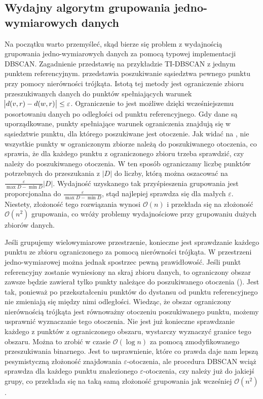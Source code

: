 \subsection{Wydajny algorytm grupowania jedno-wymiarowych danych}
Na początku warto przemyśleć, skąd bierze się problem z wydajnością grupowania jedno-wymiarowych danych za pomocą typowej implementacji DBSCAN. Zagadnienie przedstawię na przykładzie TI-DBSCAN z jednym punktem referencyjnym.  przedstawia poszukiwanie sąsiedztwa pewnego punktu przy pomocy nierówności trójkąta. Istotą tej metody jest ograniczenie zbioru przeszukiwanych danych do punktów spełniających warunek $ \abs{d(v, r) - d(w, r)} \le \varepsilon $. Ograniczenie to jest możliwe dzięki wcześniejszemu posortowaniu danych po odległości od punktu referencyjnego. Gdy dane są uporządkowane, punkty spełniające warunek ograniczenia znajdują się w sąsiedztwie punktu, dla którego poszukiwane jest otoczenie. Jak widać na , nie wszystkie punkty w ograniczonym zbiorze należą do poszukiwanego otoczenia, co sprawia, że dla każdego punktu z ograniczonego zbioru trzeba sprawdzić, czy należy do poszukiwanego otoczenia. W ten sposób ograniczamy liczbę punktów potrzebnych do przeszukania z $ |D| $ do liczby, którą można oszacować na $ \frac{\varepsilon}{\max{D}-\min{D}}|D| $. Wydajność uzyskanego tak przyśpieszenia grupowania jest proporcjonalna do $ \frac{\varepsilon}{\max{D}-\min{D}} $, stąd najlepiej sprawdza się dla małych $ \varepsilon $. Niestety, złożoność tego rozwiązania wynosi $ \mathcal{O}(n) $ i przekłada się na złożoność $ \mathcal{O}(n^2) $ grupowania, co wróży problemy wydajnościowe przy grupowaniu dużych zbiorów danych.\par



Jeśli grupujemy wielowymiarowe przestrzenie, konieczne jest sprawdzanie każdego punktu ze zbioru ograniczonego za pomocą nierówności trójkąta. W przestrzeni jedno-wymiarowej można jednak spostrzec pewną prawidłowość. Jeśli punkt referencyjny zostanie wyniesiony na skraj zbioru danych, to ograniczony obszar zawsze będzie zawierał tylko punkty należące do poszukiwanego otoczenia (). Jest tak, ponieważ po przekształceniu punktów do dystansu od punktu referencyjnego nie zmieniają się między nimi odległości. Wiedząc, że obszar ograniczony nierównością trójkąta jest równoważny otoczeniu poszukiwanego punktu, możemy usprawnić wyznaczanie tego otoczenia. Nie jest już konieczne sprawdzanie każdego z punktów z ograniczonego obszaru, wystarczy wyznaczyć granice tego obszaru. Można to zrobić w czasie $ \mathcal{O}(\log{}n) $ za pomocą zmodyfikowanego przeszukiwania binarnego\cite{binaryboundarysearch}. Jest to usprawnienie, które co prawda daje nam lepszą pesymistyczną złożoność znajdowania $ \varepsilon $-otoczenia, ale procedura DBSCAN wciąż sprawdza dla każdego punktu znalezionego $ \varepsilon $-otoczenia, czy należy już do jakiejś grupy, co przekłada się na taką samą złożoność grupowania jak wcześniej $ \mathcal{O}(n^2) $.\par

